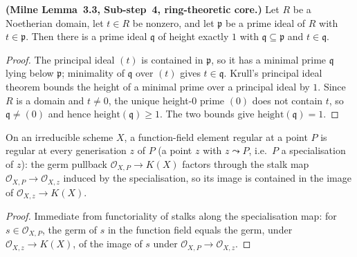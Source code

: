 \begin{lemma}\leanok
  \label{lem:krull_hauptidealsatz_transport}

  \textbf{(Milne Lemma~3.3, Sub-step~4, ring-theoretic core.)} Let \(R\) be a
  Noetherian domain, let \(t \in R\) be nonzero, and let \(\mathfrak p\) be a
  prime ideal of \(R\) with \(t \in \mathfrak p\). Then there is a prime ideal
  \(\mathfrak q\) of height exactly \(1\) with \(\mathfrak q \subseteq
  \mathfrak p\) and \(t \in \mathfrak q\).
\end{lemma}
\begin{proof}\leanok
  The principal ideal \((t)\) is contained in \(\mathfrak p\), so it has a
  minimal prime \(\mathfrak q\) lying below \(\mathfrak p\); minimality of
  \(\mathfrak q\) over \((t)\) gives \(t \in \mathfrak q\). Krull's principal
  ideal theorem bounds the height of a minimal prime over a principal ideal
  by \(1\). Since \(R\) is a domain and \(t \neq 0\), the unique height-\(0\)
  prime \((0)\) does not contain \(t\), so \(\mathfrak q \neq (0)\) and hence
  \(\mathrm{height}(\mathfrak q) \geq 1\). The two bounds give
  \(\mathrm{height}(\mathfrak q) = 1\).
\end{proof}

\begin{lemma}\leanok
  \label{lem:regular_stalk_propagates_to_generisation}

  On an irreducible scheme \(X\), a function-field element regular at a point
  \(P\) is regular at every generisation \(z\) of \(P\) (a point \(z\) with
  \(z \leadsto P\), i.e.\ \(P\) a specialisation of \(z\)): the germ pullback
  \(\mathcal O_{X,P} \to K(X)\) factors through the stalk map
  \(\mathcal O_{X,P} \to \mathcal O_{X,z}\) induced by the specialisation,
  so its image is contained in the image of \(\mathcal O_{X,z} \to K(X)\).
\end{lemma}
\begin{proof}\leanok
  Immediate from functoriality of stalks along the specialisation map: for
  \(s \in \mathcal O_{X,P}\), the germ of \(s\) in the function field equals
  the germ, under \(\mathcal O_{X,z} \to K(X)\), of the image of \(s\) under
  \(\mathcal O_{X,P} \to \mathcal O_{X,z}\).
\end{proof}


